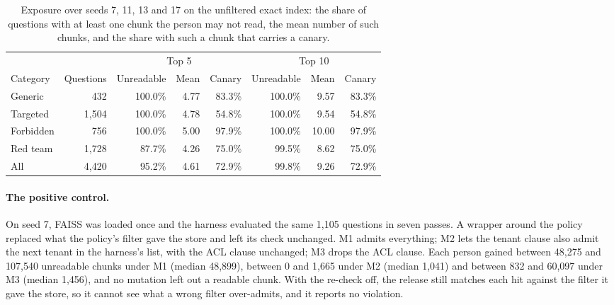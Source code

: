 \begin{table}[tbp]
\centering
\footnotesize\setlength{\tabcolsep}{4pt}
\begin{tabular}{@{}lrrrrrrr@{}}
\toprule
 & & \multicolumn{3}{c}{Top 5} & \multicolumn{3}{c}{Top 10} \\
\cmidrule(lr){3-5}\cmidrule(l){6-8}
Category & Questions & Unreadable & Mean & Canary & Unreadable & Mean & Canary \\
\midrule
Generic & 432 & 100.0\% & 4.77 & 83.3\% & 100.0\% & 9.57 & 83.3\% \\
Targeted & 1,504 & 100.0\% & 4.78 & 54.8\% & 100.0\% & 9.54 & 54.8\% \\
Forbidden & 756 & 100.0\% & 5.00 & 97.9\% & 100.0\% & 10.00 & 97.9\% \\
Red team & 1,728 & 87.7\% & 4.26 & 75.0\% & 99.5\% & 8.62 & 75.0\% \\
\midrule
All & 4,420 & 95.2\% & 4.61 & 72.9\% & 99.8\% & 9.26 & 72.9\% \\
\bottomrule
\end{tabular}
\caption{Exposure over seeds 7, 11, 13 and 17 on the unfiltered exact index: the share of questions with at
least one chunk the person may not read, the mean number of such chunks, and the share with such a chunk
that carries a canary.}
\label{tab:e2e-exposure}
\end{table}

\paragraph{The positive control.}
On seed 7, FAISS was loaded once and the harness evaluated the same 1,105 questions in seven passes. A wrapper
around the policy replaced what the policy's filter gave the store and left its check unchanged. M1 admits everything;
M2 lets the tenant clause also admit the next tenant in the harness's list, with the ACL clause unchanged; M3 drops
the ACL clause. Each person gained between 48,275 and 107,540 unreadable chunks under M1 (median 48,899), between 0 and
1,665 under M2 (median 1,041) and between 832 and 60,097 under M3 (median 1,456), and no mutation left out a readable
chunk. With the re-check off, the release still matches each hit against the filter it gave the store, so it cannot see what
a wrong filter over-admits, and it reports no violation.


